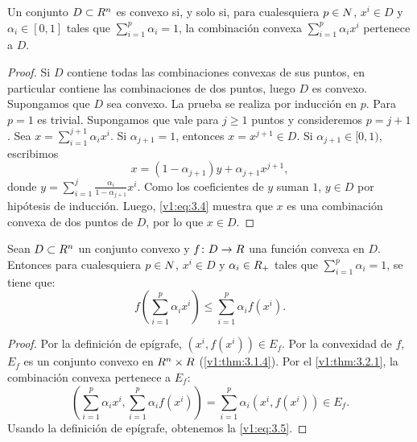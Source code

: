 \begin{theorem}\label{v1:thm:3.2.1}
 Un conjunto $D \subset R^n$ es convexo si, y solo si, para cualesquiera $p \in N$, $x^i \in D$ y $\alpha_i \in [0, 1]$ tales que $\sum_{i=1}^p \alpha_i = 1$, la combinación convexa $\sum_{i=1}^p \alpha_i x^i$ pertenece a $D$.
\end{theorem}

\begin{proof}
 Si $D$ contiene todas las combinaciones convexas de sus puntos, en particular contiene las combinaciones de dos puntos, luego $D$ es convexo. Supongamos que $D$ sea convexo. La prueba se realiza por inducción en $p$. Para $p = 1$ es trivial. Supongamos que vale para $j \geq 1$ puntos y consideremos $p = j + 1$. Sea $x = \sum_{i=1}^{j+1} \alpha_i x^i$. Si $\alpha_{j+1} = 1$, entonces $x = x^{j+1} \in D$. Si $\alpha_{j+1} \in [0, 1)$, escribimos
 \begin{equation}
 x = (1 - \alpha_{j+1})y + \alpha_{j+1} x^{j+1}, \label{v1:eq:3.4}
 \end{equation}
 donde $y = \sum_{i=1}^j \frac{\alpha_i}{1 - \alpha_{j+1}} x^i$. Como los coeficientes de $y$ suman $1$, $y \in D$ por hipótesis de inducción. Luego, \eqref{v1:eq:3.4} muestra que $x$ es una combinación convexa de dos puntos de $D$, por lo que $x \in D$.
\end{proof}

\begin{corollary}\label{v1:cor:3.2.2}
 Sean $D \subset R^n$ un conjunto convexo y $f \colon D \to R$ una función convexa en $D$. Entonces para cualesquiera $p \in N$, $x^i \in D$ y $\alpha_i \in R_+$ tales que $\sum_{i=1}^p \alpha_i = 1$, se tiene que:
 \begin{equation}
 f\left(\sum_{i=1}^p \alpha_i x^i\right) \leq \sum_{i=1}^p \alpha_i f(x^i). \label{v1:eq:3.5}
 \end{equation}
\end{corollary}

\begin{proof}
 Por la definición de epígrafe, $(x^i, f(x^i)) \in E_f$. Por la convexidad de $f$, $E_f$ es un conjunto convexo en $R^n \times R$ (\cref{v1:thm:3.1.4}). Por el \cref{v1:thm:3.2.1}, la combinación convexa pertenece a $E_f$:
 \[
 \left(\sum_{i=1}^p \alpha_i x^i, \sum_{i=1}^p \alpha_i f(x^i)\right) = \sum_{i=1}^p \alpha_i (x^i, f(x^i)) \in E_f.
 \]
 Usando la definición de epígrafe, obtenemos la \eqref{v1:eq:3.5}.
\end{proof}


